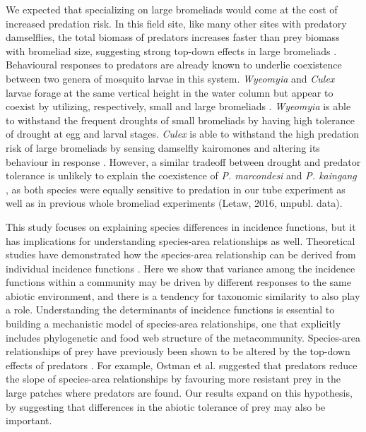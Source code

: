 We expected that specializing on large bromeliads would come at the cost
of increased predation risk. In this field site, like many other sites
with predatory damselflies, the total biomass of predators increases
faster than prey biomass with bromeliad size, suggesting strong top-down
effects in large bromeliads \citep{Petermann2015a}. Behavioural
responses to predators are already known to underlie coexistence between
two genera of mosquito larvae in this system. \emph{Wyeomyia} and
\emph{Culex} larvae forage at the same vertical height in the water
column but appear to coexist by utilizing, respectively, small and large
bromeliads \citep{Gilbert2008}. \emph{Wyeomyia} is able to withstand the
frequent droughts of small bromeliads by having high tolerance of
drought at egg \citep{Dezerald2015} and larval \citep{Amundrud2015}
stages. \emph{Culex} is able to withstand the high predation risk of
large bromeliads by sensing damselfly kairomones and altering its
behaviour in response \citep{Hammill2015}. However, a similar tradeoff
between drought and predator tolerance is unlikely to explain the
coexistence of \emph{P. marcondesi} and \emph{P. kaingang} , as both
species were equally sensitive to predation in our tube experiment as
well as in previous whole bromeliad experiments (Letaw, 2016, unpubl.
data).

This study focuses on explaining species differences in incidence
functions, but it has implications for understanding species-area
relationships as well. Theoretical studies have demonstrated how the
species-area relationship can be derived from individual incidence
functions \citep{Ovaskainen2003}. Here we show that variance among the
incidence functions within a community may be driven by different
responses to the same abiotic environment, and there is a tendency for
taxonomic similarity to also play a role. Understanding the determinants
of incidence functions is essential to building a mechanistic model of
species-area relationships, one that explicitly includes phylogenetic
and food web structure of the metacommunity. Species-area relationships
of prey have previously been shown to be altered by the top-down effects
of predators \citep{Ryberg2007}. For example, Ostman et al.
\citeyearpar{Ostman2007} suggested that predators reduce the slope of
species-area relationships by favouring more resistant prey in the large
patches where predators are found. Our results expand on this
hypothesis, by suggesting that differences in the abiotic tolerance of
prey may also be important.

